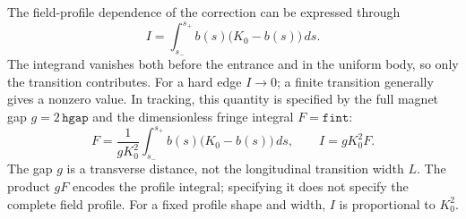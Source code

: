 The field-profile dependence of the correction can be expressed through
\begin{equation}
 I=\int_{s_-}^{s_+}b(s)\bigl(K_0-b(s)\bigr)\,ds.
\end{equation}
The integrand vanishes both before the entrance and in the uniform body,
so only the transition contributes. For a hard edge $I\to0$; a finite
transition generally gives a nonzero value. In tracking, this quantity is
specified by the full magnet gap $g=2\,\texttt{hgap}$ and the dimensionless
fringe integral $F=\texttt{fint}$:
\begin{equation}
 F=\frac{1}{gK_0^2}\int_{s_-}^{s_+}
          b(s)\bigl(K_0-b(s)\bigr)\,ds,\qquad I=gK_0^2F.
 \label{eq:fringe_integral}
\end{equation}
The gap $g$ is a transverse distance, not the longitudinal transition width
$L$. The product $gF$ encodes the profile integral; specifying it does not
specify the complete field profile. For a fixed profile shape and width,
$I$ is proportional to $K_0^2$.

